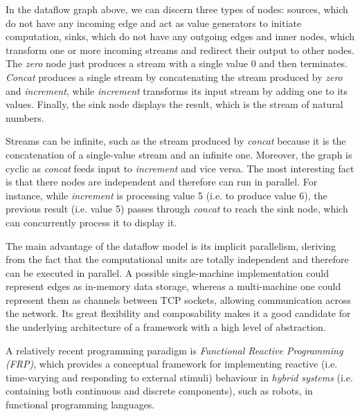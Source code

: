 \documentclass{dithesis}
\begin{document}

In the dataflow graph above, we can discern three types of nodes: sources, which do not have any incoming edge and act as value generators to initiate computation, sinks, which do not have any outgoing edges and inner nodes, which transform one or more incoming streams and redirect their output to other nodes. The \textit{zero} node just produces a stream with a single value 0 and then terminates. \textit{Concat} produces a single stream by concatenating the stream produced by \textit{zero} and \textit{increment}, while \textit{increment} transforms its input stream by adding one to its values. Finally, the sink node displays the result, which is the stream of natural numbers.

Streams can be infinite, such as the stream produced by \textit{concat} because it is the concatenation of a single-value stream and an infinite one. Moreover, the graph is cyclic as \textit{concat} feeds input to \textit{increment} and vice versa. The most interesting fact is that there nodes are independent and therefore can run in parallel. For instance, while \textit{increment} is processing value 5 (i.e. to produce value 6), the previous result (i.e. value 5) passes through \textit{concat} to reach the sink node, which can concurrently process it to display it. 

The main advantage of the dataflow model is its implicit parallelism, deriving from the fact that the computational units are totally independent and therefore can be executed in parallel. A possible single-machine implementation could represent edges as in-memory data storage, whereas a multi-machine one could represent them as channels between TCP sockets, allowing communication across the network. Its great flexibility and composability makes it a good candidate for the underlying architecture of a framework with a high level of abstraction.


A relatively recent programming paradigm is \textit{Functional Reactive Programming (FRP)}, which provides a conceptual framework for implementing reactive (i.e. time-varying and responding to external stimuli) behaviour in \textit{hybrid systems} (i.e. containing both continuous and discrete components), such as robots, in functional programming languages. 
\end{document}
